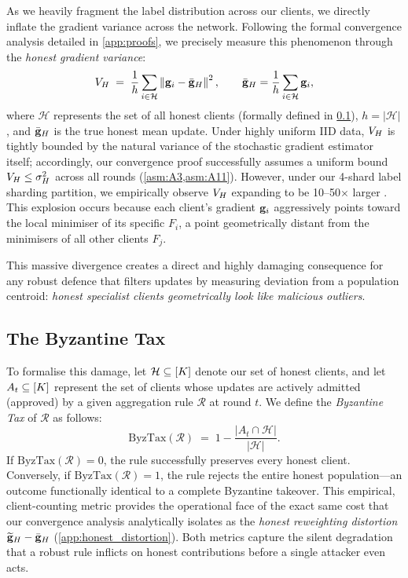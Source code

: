 \documentclass[../main]{subfiles}
\begin{document}
As we heavily fragment the label distribution across our clients, we directly inflate the gradient variance across the network. Following the formal convergence analysis detailed in \cref{app:proofs}, we precisely measure this phenomenon through the \emph{honest gradient variance}:
\begin{equation}
    V_{H} \;=\; \frac{1}{h} \sum_{i \in \mathcal{H}} \left\| \mathbf{g}_{i} - \bar{\mathbf{g}}_{H} \right\|^2,
    \qquad \bar{\mathbf{g}}_{H} = \frac{1}{h}\sum_{i \in \mathcal{H}} \mathbf{g}_{i},
    \label{eq:gradient_dissimilarity}
\end{equation}
where $\mathcal{H}$ represents the set of all honest clients (formally defined in \cref{sec:bg_byz_tax}), $h = |\mathcal{H}|$, and $\bar{\mathbf{g}}_{H}$ is the true honest mean update. Under highly uniform IID data, $V_{H}$ is tightly bounded by the natural variance of the stochastic gradient estimator itself; accordingly, our convergence proof successfully assumes a uniform bound $V_{H} \leq \sigma_H^2$ across all rounds (\cref{asm:A3,asm:A11}). However, under our 4-shard label sharding partition, we empirically observe $V_{H}$ expanding to be 10--50$\times$ larger \citep{zhao2018federated, li2020federated}. This explosion occurs because each client's gradient $\mathbf{g}_{i}$ aggressively points toward the local minimiser of its specific $F_i$, a point geometrically distant from the minimisers of all other clients $F_j$.

This massive divergence creates a direct and highly damaging consequence for any robust defence that filters updates by measuring deviation from a population centroid: \emph{honest specialist clients geometrically look like malicious outliers}.

\subsection{The Byzantine Tax}
\label{sec:bg_byz_tax}

To formalise this damage, let $\mathcal{H} \subseteq [K]$ denote our set of honest clients, and let $A_t \subseteq [K]$ represent the set of clients whose updates are actively admitted (approved) by a given aggregation rule $\mathcal{R}$ at round $t$. We define the \emph{Byzantine Tax} of $\mathcal{R}$ as follows:
\begin{equation}
    \mathrm{ByzTax}(\mathcal{R}) \;=\; 1 - \frac{|A_t \cap \mathcal{H}|}{|\mathcal{H}|}.
    \label{eq:byz_tax}
\end{equation}
If $\mathrm{ByzTax}(\mathcal{R}) = 0$, the rule successfully preserves every honest client. Conversely, if $\mathrm{ByzTax}(\mathcal{R}) = 1$, the rule rejects the entire honest population---an outcome functionally identical to a complete Byzantine takeover. This empirical, client-counting metric provides the operational face of the exact same cost that our convergence analysis analytically isolates as the \emph{honest reweighting distortion} $\widetilde{\mathbf{g}}_H - \bar{\mathbf{g}}_{H}$ (\cref{app:honest_distortion}). Both metrics capture the silent degradation that a robust rule inflicts on honest contributions before a single attacker even acts.
\end{document}
